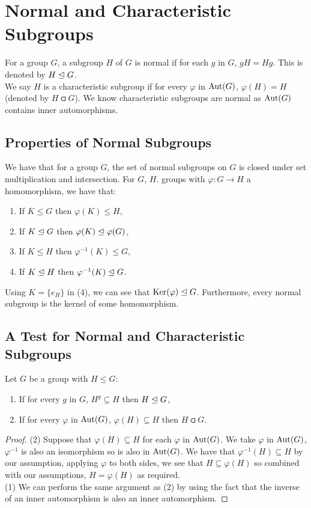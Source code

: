 \section{Normal and Characteristic Subgroups}

For a group $G$, a subgroup $H$ of $G$ is normal if for each $g$ in $G$,
$gH = Hg$. This is denoted by $H \trianglelefteq G$.
\\[\baselineskip]
We say $H$ is a characteristic subgroup if for every $\varphi$ in $\operatorname{Aut}(G)$,
$\varphi(H) = H$ (denoted by $H \csub G$). We know characteristic subgroups
are normal as $\operatorname{Aut}(G)$ contains inner automorphisms.

\subsection{Properties of Normal Subgroups}

We have that for a group $G$, the set of normal subgroups on $G$
is closed under set multiplication and intersection. For $G$, $H$.
groups with $\varphi : G \to H$ a homomorphism, we have that: \begin{enumerate}
    \item If $K \leq G$ then $\varphi(K) \leq H$,
    \item If $K \trianglelefteq G$ then $\varphi(K) \trianglelefteq \varphi(G)$,
    \item If $K \leq H$ then $\varphi^{-1}(K) \leq G$,
    \item If $K \trianglelefteq H$ then $\varphi^{-1}(K) \trianglelefteq G$.
\end{enumerate} Using $K = \{e_H\}$ in (4), we can see that $\operatorname{Ker}(\varphi) \trianglelefteq G$.
Furthermore, every normal subgroup is the kernel of some homomorphism.


\subsection{A Test for Normal and Characteristic Subgroups}

Let $G$ be a group with $H \leq G$: \begin{enumerate}
    \item If for every $g$ in $G$, $H^g \subseteq H$ then $H \trianglelefteq G$,
    \item If for every $\varphi$ in $\operatorname{Aut}(G)$, $\varphi(H) \subseteq H$ 
        then $H \csub G$.
\end{enumerate}

\begin{proof}
    (2) Suppose that $\varphi(H) \subseteq H$ for each $\varphi$ in $\operatorname{Aut}(G)$.
    We take $\varphi$ in $\operatorname{Aut}(G)$, $\varphi^{-1}$ is also an isomorphism
    so is also in $\operatorname{Aut}(G)$. We have that $\varphi^{-1}(H) \subseteq H$
    by our assumption, applying $\varphi$ to both sides, we see that
    $H \subseteq \varphi(H)$ so combined with our assumptions, 
    $H = \varphi(H)$ as required.
    \\[\baselineskip]
    (1) We can perform the same argument as (2) by using the fact that the
    inverse of an inner automorphism is also an inner automorphism.
\end{proof}

